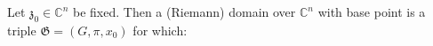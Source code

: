 Let $\mathfrak{z}_0 \in \mathbb{C}^n$ be fixed. Then a (Riemann) domain over $\mathbb{C}^n$ with base point is a triple $\mathfrak{G} = (G, \pi, x_0)$ for which:
